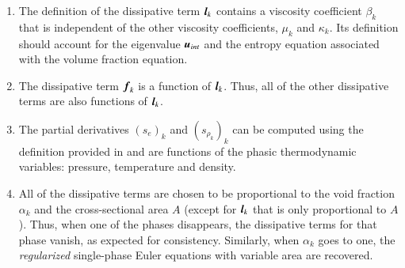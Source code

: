 \begin{enumerate}
\item {The definition of the dissipative term $\boldsymbol l_k$ contains a viscosity
    coefficient $\beta_k$ that is independent of
    the other viscosity coefficients, $\mu_k$ and $\kappa_k$. Its definition should
    account for the eigenvalue $\boldsymbol u_{int}$ and  the entropy equation associated with the volume fraction equation.}

\item {The dissipative term $\boldsymbol f_k$ is a function of $\boldsymbol l_k$. Thus, all of the other
    dissipative terms are also functions of $\boldsymbol l_k$.}

\item {The partial derivatives $(s_e)_k$ and $(s_{\rho_k})_k$ can be computed using the
    definition provided in  and are functions of the phasic thermodynamic
    variables: pressure, temperature and density.}

\item {All of the dissipative terms are chosen to be proportional to the void
    fraction $\alpha_k$ and the cross-sectional area $A$ (except for $\boldsymbol l_k$ that is only proportional to $A$). 
    Thus, when one of the phases disappears, the dissipative terms for that phase vanish, as expected 
    for consistency. Similarly, when $\alpha_k$ goes to one,
    the \emph{regularized} single-phase Euler equations with variable area are recovered. %
		}    


\end{enumerate}
